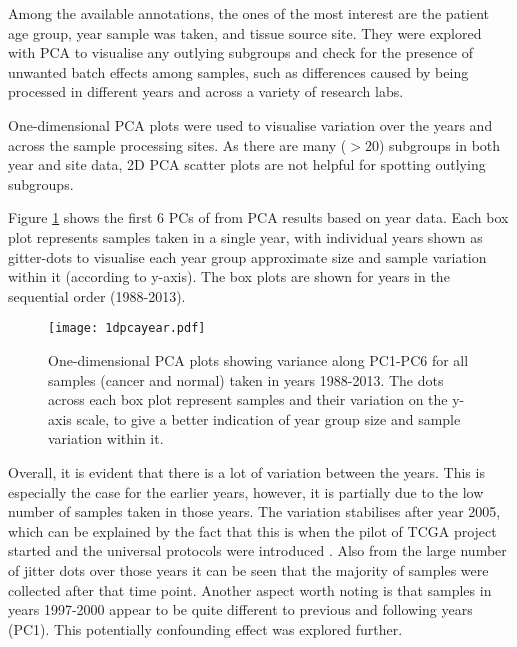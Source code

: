     Among the available annotations, the ones of the most interest are the patient age group, year sample was taken, and tissue source site. They were explored with PCA to visualise any outlying subgroups and check for the presence of unwanted batch effects among samples, such as differences caused by being processed in different years and across a variety of research labs.
    
    One-dimensional PCA plots were used to visualise variation over the years and across the sample processing sites. As there are many ($>20$) subgroups in both year and site data, 2D PCA scatter plots are not helpful for spotting outlying subgroups. 
    
    Figure \ref{fig:1dpcayear} shows the first 6 PCs of from PCA results based on year data. Each box plot represents samples taken in a single year, with individual years shown as gitter-dots to visualise each year group approximate size and sample variation within it (according to y-axis). The box plots are shown for years in the sequential order (1988-2013). \\
  
        
            \begin{figure}[!h]
            \centering
            \texttt{[image: 1dpcayear.pdf]}
            \caption[1D PCA plot based on year data]{One-dimensional PCA plots showing variance along PC1-PC6 for all samples (cancer and normal) taken in years 1988-2013. The dots across each box plot represent samples and their variation on the y-axis scale, to give a better indication of year group size and sample variation within it.}
            \label{fig:1dpcayear}
            \end{figure}
    
    Overall, it is evident that there is a lot of variation between the years. This is especially the case for the earlier years, however, it is partially due to the low number of samples taken in those years.  The variation stabilises after year 2005, which can be explained by the fact that this is when the pilot of TCGA project started and the universal protocols were introduced \cite{OverviewTCGA}. Also from the large number of jitter dots over those years it can be seen that the majority of samples were collected after that time point. Another aspect worth noting is that samples in years 1997-2000 appear to be quite different to previous and following years (PC1). This potentially confounding effect was explored further. \\
    \newline
    

